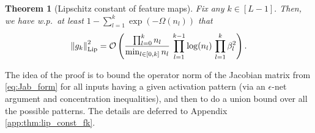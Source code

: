 \documentclass[11pt]{article}
\newcommand{\Quynh}[1]{\textbf{\color{red}QN: #1}}
\newtheorem{theorem}{Theorem}[section]
\newcommand{\bigO}[1]{\mathcal{O}\left(#1\right)}
\newcommand{\bigOmg}[1]{\Omega\left(#1\right)}
\newcommand{\bigexp}[1]{\exp\left(#1\right)}
\newcommand{\norm}[1]{\left\|#1\right\|}
\def\Lip{\mathrm{Lip}}
\def\min{\mathop{\rm min}\nolimits}
\begin{document}
\begin{theorem}[Lipschitz constant of feature maps]\label{thm:lip_const_fk}
    Fix any $k\in[L-1].$
    Then, we have w.p.\ at least $1-\sum_{l=1}^{k}\bigexp{-\bigOmg{n_l}}$ %
    that
   \begin{align}\label{eq:bound_lip_gk}
	\norm{g_k}_{\Lip}^2
	=\bigO{ \frac{\prod_{l=0}^k n_l}{\min_{l\in[0,k]}n_l}\, \prod_{l=1}^{k-1}\log(n_l)\, \prod_{l=1}^{k}\beta_l^2} .
    \end{align}
\end{theorem}
The idea of the proof is to bound the operator norm of the Jacobian matrix from \eqref{eq:Jab_form} for all inputs having a given activation pattern 
(via an $\epsilon$-net argument and concentration inequalities),
and then to do a union bound over all the possible patterns. The details are deferred to Appendix \ref{app:thm:lip_const_fk}. 


% 

\end{document}
